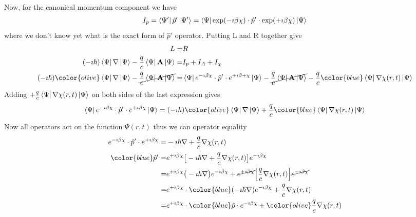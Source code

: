 \documentclass[11pt]{article}
\begin{document}
Now, for the canonical momentum component we have
\begin{align*}
I_p=\bra{\Psi'} \hat p ' \ket{\Psi'}  = \bra{\Psi}  \exp(-\imath \beta \chi) \cdot {\hat p ' } \cdot \exp(+\imath \beta \chi)\ket{\Psi} 
\end{align*}
where we don't know yet what is the exact form of $\hat p'$  operator. Putting L and R together give
\begin{align*}
  L =& R \\
  (-\imath \hbar) \bra{\Psi}\nabla \ket{\Psi} -  \frac{q}{c} \bra{\Psi} \vb A \ket{\Psi} =&
  I_p +I_A+ I_\chi \\
   (-\imath \hbar) {\color{olive} \bra{\Psi}  \nabla \ket{\Psi}} - \cancel{ \frac{q}{c} \bra{\Psi} \vb A \ket{\Psi} }=& \bra{\Psi}  e^{-\imath \beta \chi} \cdot {\hat p ' } \cdot e^{+\imath \beta  + \chi}\ket{\Psi} -\cancel{ \frac{q}{c}  \bra{\Psi}  \vb A \ket{\Psi} }  -\frac{q}{c} {\color{blue} \bra{\Psi}  \nabla\chi (r,t) \ket{\Psi} }
\end{align*}
Adding $+\frac{q}{c} \bra{\Psi}  \nabla\chi (r,t) \ket{\Psi}$ on  both sides of the last expression gives
\begin{align*}
    \bra{\Psi}  e^{-\imath \beta \chi} \cdot {\hat p ' } \cdot e^{+\imath \beta\chi} \ket{\Psi}  
    =   (-\imath \hbar)  {\color{olive} \bra{\Psi} \nabla \ket{\Psi}}  + \frac{q}{c} {\color{blue} \bra{\Psi}  \nabla\chi (r,t) \ket{\Psi} }
\end{align*}
Now all  operators act on the function $\Psi(r,t)$ thus we can operator equality
\begin{align*}
      e^{-\imath \beta \chi} \cdot {\hat p ' } \cdot e^{+\imath \beta \chi}
      =& -\imath \hbar \nabla +\frac{q}{c} \nabla \chi(r,t) \\
      \color{blue} \hat p' = & e^{+\imath \beta \chi}\big[ -\imath \hbar \nabla  +\frac{q}{c} \nabla \chi(r,t)     \big] e^{- \imath \beta\chi}  \\
      =& e^{+\imath \beta \chi}\big( -\imath \hbar \nabla  \big) e^{- \imath \beta\chi}   + 
      \cancel{ e^{+\imath \beta \chi}} \Big[ \frac{q}{c} \nabla \chi(r,t)  \Big] \cancel{ e^{- \imath \beta\chi}}  \\
      =& e^{+\imath \beta \chi} \cdot {\color{blue}(-\imath \hbar \nabla  )} e^{- \imath \beta \chi} 
      +  \frac{q}{c} \nabla \chi(r,t) \\
      =& e^{+\imath \beta \chi} \cdot {\color{blue} \hat p} \cdot e^{- \imath \beta \chi} 
      +  {\color{olive} \frac{q}{c} \nabla \chi(r,t) } 
\end{align*}
\end{document}
